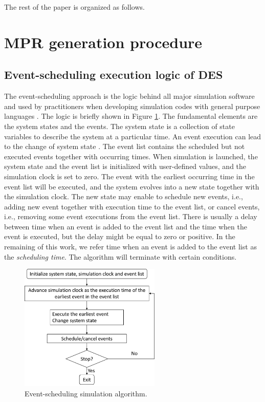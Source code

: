 \documentclass[]{interact}
\theoremstyle{plain}%
\theoremstyle{definition}
\theoremstyle{remark}
\begin{document}

The rest of the paper is organized as follows. 

\section{MPR generation procedure}
\subsection{Event-scheduling execution logic of DES } \label{sec:SimAlgo}

The event-scheduling approach is the logic behind all major simulation software and used by practitioners when developing simulation codes with general purpose languages \citep{law2014simulation}. The logic is briefly shown in Figure \ref{Fig:SimAlgo}. The fundamental elements are the system states and the events. The system state is a collection of state variables to describe the system at a particular time. An event execution can lead to the change of system state%
. The event list contains the scheduled but not executed events together with occurring times. When simulation is launched, the system state and the event list is initialized with user-defined values, and the simulation clock is set to zero. The event with the earliest occurring time in the event list will be executed, and the system evolves into a new state together with the simulation clock. The new state may enable to schedule new events, i.e., adding new event together with execution time to the event list, or cancel events, i.e., removing some event executions from the event list. There is usually a delay between time when an event is added to the event list and the time when the event is executed, but the delay might be equal to zero or positive. In the remaining of this work, we refer time when an event is added to the event list as the \textit{scheduling time}. The algorithm will terminate with certain conditions. 

\begin{figure}[h]
	\centering
	\includegraphics[width=0.6\textwidth]{Figures/EventSimAlgo.png}
	\caption{Event-scheduling simulation algorithm.}
	\label{Fig:SimAlgo}
\end{figure}
\end{document}
